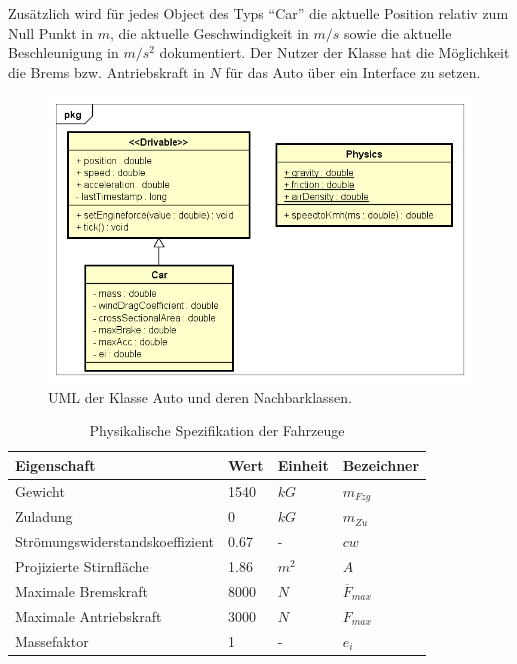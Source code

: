 \documentclass[12pt,a4paper,bibliography=totocnumbered,listof=totocnumbered, abstracton]{scrartcl}
\theoremstyle{Umgebung}
\begin{document}
Zusätzlich wird für jedes Object des Typs \enquote{Car} die aktuelle Position relativ zum Null Punkt in $m$, die aktuelle Geschwindigkeit in $m/s$ sowie  die aktuelle Beschleunigung in $m/s^2$ dokumentiert. Der Nutzer der Klasse hat die Möglichkeit die Brems bzw. Antriebskraft in $N$ für das Auto über ein Interface zu setzen.

\begin{figure}
	\centering
	\includegraphics[width=0.7\linewidth]{img/practical/car-diagram}
	\caption{UML der Klasse Auto und deren Nachbarklassen.}
	\label{fig:car}
\end{figure}

\begin{table}[]
	\centering
	\caption{Physikalische Spezifikation der Fahrzeuge}
	\label{table:car}
	\begin{tabular}{@{}llll@{}}
		\toprule
		Eigenschaft                     & Wert & Einheit & Bezeichner           \\ \midrule
		Gewicht                         & 1540 & $kG$    & $m_{Fzg}$            \\
		Zuladung                        & 0    & $kG$    & $m_{Zu}$             \\
		Strömungswiderstandskoeffizient & 0.67 & -       & $cw$                 \\
		Projizierte Stirnfläche         & 1.86 & $m^2$   & $A$                  \\
		Maximale Bremskraft             & 8000 & $N$     & $\overline{F}_{max}$ \\
		Maximale Antriebskraft          & 3000 & $N$     & $ {F}_{max} $        \\
		Massefaktor                     & 1    & -       & $ {e}_{i} $          \\ \bottomrule
	\end{tabular}
\end{table}
\end{document}
